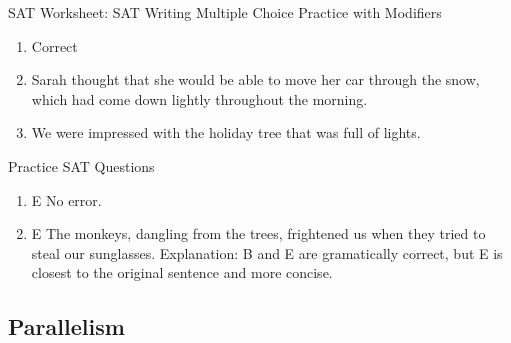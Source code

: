 \bigskip SAT Worksheet: SAT Writing Multiple Choice Practice with Modifiers

\begin{enumerate}
\item Correct

\item Sarah thought that she would be able to move her car through the snow, which had come down lightly throughout the morning.

\item We were impressed with the holiday tree that was full of lights.
\end{enumerate}

Practice SAT Questions

\begin{enumerate}
\item E No error. 
\item E The monkeys, dangling from the trees, frightened us when they tried to steal our sunglasses. Explanation: B and E are gramatically correct, but E is closest to the original sentence and more concise.
\end{enumerate}

\subsection{Parallelism}

